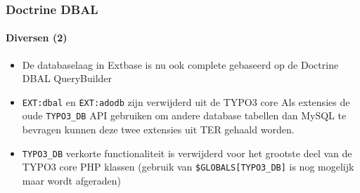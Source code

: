 \begin{frame}[fragile]
	\frametitle{Doctrine DBAL}
	\framesubtitle{Diversen (2)}

	\begin{itemize}
		\item De databaselaag in Extbase is nu ook complete gebaseerd op de Doctrine DBAL QueryBuilder
		\item \texttt{EXT:dbal} en \texttt{EXT:adodb} zijn verwijderd uit de TYPO3 core\newline
			\smaller
				Als extensies de oude \texttt{TYPO3\_DB} API gebruiken om andere database tabellen dan MySQL te
				bevragen kunnen deze twee extensies uit TER gehaald worden.
			\normalsize

		\item \texttt{TYPO3\_DB} verkorte functionaliteit is verwijderd voor het grootste deel van de TYPO3 core PHP klassen\newline
			\smaller
				(gebruik van \texttt{\$GLOBALS[TYPO3\_DB]} is nog mogelijk maar wordt afgeraden)
			\normalsize

	\end{itemize}

\end{frame}

